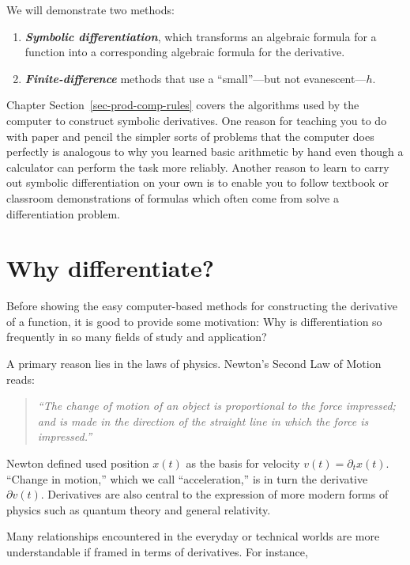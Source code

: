 \documentclass[
  letterpaper,
  DIV=11,
  numbers=noendperiod,
  oneside]{scrreprt}
\begin{document}
We will demonstrate two methods:

\begin{enumerate}
\def\labelenumi{\arabic{enumi}.}
\item
  \textbf{\emph{Symbolic differentiation}}, which transforms an
  algebraic formula for a function into a corresponding algebraic
  formula for the derivative.
\item
  \textbf{\emph{Finite-difference}} methods that use a ``small''---but
  not evanescent---\(h\).
\end{enumerate}

Chapter Section~\ref{sec-prod-comp-rules} covers the algorithms used by
the computer to construct symbolic derivatives. One reason for teaching
you to do with paper and pencil the simpler sorts of problems that the
computer does perfectly is analogous to why you learned basic arithmetic
by hand even though a calculator can perform the task more reliably.
Another reason to learn to carry out symbolic differentiation on your
own is to enable you to follow textbook or classroom demonstrations of
formulas which often come from solve a differentiation problem.

\hypertarget{why-differentiate}{%
\section{Why differentiate?}\label{why-differentiate}}

Before showing the easy computer-based methods for constructing the
derivative of a function, it is good to provide some motivation: Why is
differentiation so frequently in so many fields of study and
application?

A primary reason lies in the laws of physics. Newton's Second Law of
Motion reads:

\begin{quote}
\emph{``The change of motion of an object is proportional to the force
impressed; and is made in the direction of the straight line in which
the force is impressed.''}
\end{quote}

Newton defined used position \(x(t)\) as the basis for velocity
\(v(t) = \partial_t x(t)\). ``Change in motion,'' which we call
``acceleration,'' is in turn the derivative \(\partial v(t)\).
Derivatives are also central to the expression of more modern forms of
physics such as quantum theory and general relativity.

Many relationships encountered in the everyday or technical worlds are
more understandable if framed in terms of derivatives. For instance,
\end{document}
